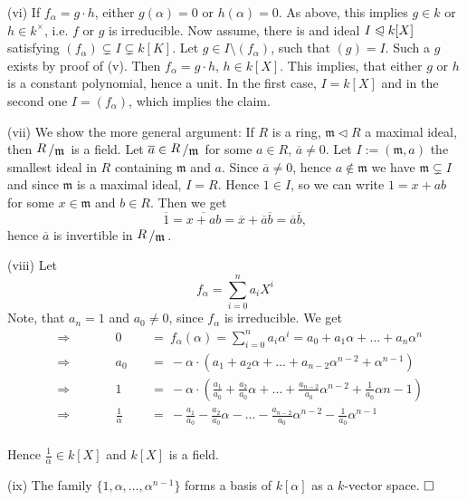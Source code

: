 \documentclass[11pt]{book}
\theoremstyle{nonumberbreak}
\newenvironment{pr}[1][]{\ifthenelse{\equal{#1}{}}{\proof}{\proof[#1]}\rm}{\endproof}
\newenvironment{er}[1][]{\ifthenelse{\equal{#1}{}}{\erinner}{\erinner[#1]}\rm}{\enderinner}
\newcommand{\slant}[2]{{\raisebox{.1em}{$#1$}\left/\raisebox{-.1em}{$#2$}\right.}}
\begin{document}
\begin{spacing}{1.3}
\begin{er}
\begin{pr}
\begin{compactenum}
\item[(vi)] If $f_{\alpha}=g \cdot h$, either $g(\alpha)=0$ or $h(\alpha)=0$. As above, this implies $g \in k$ or $h \in k^{\times}$, i.e. $f$ or $g$ is irreducible.
Now assume, there is and ideal $I \trianglelefteqslant k[X]$ satisfying $( f_{\alpha}) \subsetneq I \subsetneq k[K]$.
Let $g \in  I \setminus ( f_{\alpha})$, such that $( g ) = I $. Such a $g$ exists by proof of (v). Then $f_{\alpha}=g \cdot h$, $h \in k[X]$. This implies, that either $g$ or $h$ is a constant polynomial, hence a unit. In the first case, $I=k[X]$ and in the second one $I=( f_{\alpha})$, which implies the claim.
\item[(vii)] We show the more general argument: If $R$ is a ring, $\mathfrak{m} \triangleleft R$ a maximal ideal, then $\slant{R}{\mathfrak{m}}$ is a field. Let $\overline{a} \in \slant{R}{\mathfrak{m}}$ for some $a \in R$, $\overline{a}\neq 0$. Let $I:=( \mathfrak{m}, a)$ the smallest ideal in $R$ containing $\mathfrak{m}$ and $a$. Since $\overline{a} \neq 0$, hence $a \notin \mathfrak{m}$ we have $\mathfrak{m} \subsetneq I$ and since $\mathfrak{m}$ is a maximal ideal, $I=R$. Hence $1 \in I$, so we can write $1=x+ab$ for some $x \in \mathfrak{m}$ and $b \in R$. Then we get
$$\overline{1}=\overline{x+ab}=\overline{x}+\overline{a}\overline{b}=\overline{a}\overline{b},$$ hence $\overline{a}$ is invertible in $\slant{R}{\mathfrak{m}}$.
\item[(viii)] Let $$f_{\alpha}=\sum_{i=0}^n a_i X^{i}$$
Note, that $a_n=1$ and $a_0 \neq 0$, since $f_{\alpha}$ is irreducible. We get\\[-27pt]
\begin{alignat*}{5}
&\Longrightarrow \qquad &&0&&\ =\ f_{\alpha}(\alpha)=\sum_{i=0}^n a_i \alpha^{i}=a_0 + a_1 \alpha + \dots + a_n \alpha^n\\
&\Longrightarrow \qquad &&a_0&&\ =\ - \alpha \cdot \left(a_1+a_2 \alpha+ \dots + a_{n-2}\alpha^{n-2}+\alpha^{n-1}\right)\\
&\Longrightarrow \qquad &&1&&\ =\ -\alpha \cdot \left(\frac{a_1}{a_0}+\frac{a_2}{a_0}\alpha+ \dots + \frac{a_{n-2}}{a_0} \alpha^{n-2}+\frac{1}{a_0} \alpha{n-1}\right)\\
&\Longrightarrow \qquad &&\frac{1}{\alpha}&&\ =\ -\frac{a_1}{a_0}-\frac{a_2}{a_0}\alpha- \dots - \frac{a_{n-2}}{a_0} \alpha^{n-2}-\frac{1}{a_0} \alpha^{n-1}
\end{alignat*}\\[-24pt]
Hence $\frac{1}{\alpha} \in k[X]$ and $k[X]$ is a field.
\item[(ix)] The family $\{1,\alpha, \dots , \alpha^{n-1}\}$ forms a basis of $k[\alpha]$ as a $k$-vector space. $\hfill \Box$
\end{compactenum}
\end{pr}
\end{er}


\end{spacing}
\end{document}
